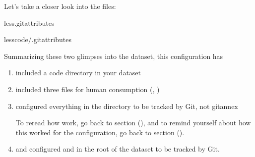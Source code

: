\sphinxAtStartPar
Let’s take a closer look into the  files:

\begin{sphinxVerbatim}[commandchars=\\\{\}]
less.gitattributes


lesscode/.gitattributes

\end{sphinxVerbatim}

\sphinxAtStartPar
Summarizing these two glimpses into the dataset, this configuration has
\begin{enumerate}
%
\item {} 
\sphinxAtStartPar
included a code directory in your dataset

\item {} 
\sphinxAtStartPar
included three files for human consumption (, )

\item {} 
\sphinxAtStartPar
configured everything in the  directory to be tracked by Git, not git\sphinxhyphen{}annex%
\begin{footnote}\sphinxAtStartFootnote
To re\sphinxhyphen{}read how  work, go back to section {\hyperref[\detokenize{basics/101-122-config:config}]{}} (), and to remind yourself
about how this worked for the  configuration, go back to section {\hyperref[\detokenize{basics/101-114-txt2git:text2git}]{}} ().
%
\end{footnote}

\item {} 
\sphinxAtStartPar
and configured  and  in the root of the dataset to be
tracked by Git.

\end{enumerate}

